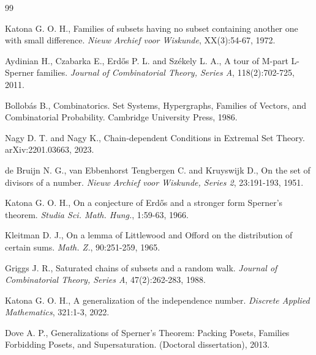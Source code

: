 \documentclass[11pt, reqno]{amsart}
\numberwithin{equation}{section}
\begin{document}
\begin{thebibliography}{99}

 Katona G. O. H., Families of subsets having no subset containing another one with small difference. \textit{Nieuw Archief voor Wiskunde}, XX(3):54-67, 1972.

 Aydinian H., Czabarka E., Erdős P. L. and Székely L. A., A tour of M-part L-Sperner families. \textit{Journal of Combinatorial Theory, Series A}, 118(2):702-725, 2011.

 Bollobás B., Combinatorics. Set Systems, Hypergraphs, Families of Vectors, and Combinatorial Probability. Cambridge University Press, 1986.

 Nagy D. T. and Nagy K., Chain-dependent Conditions in Extremal Set Theory. arXiv:2201.03663, 2023.

 de Bruijn N. G., van Ebbenhorst Tengbergen C. and Kruyswijk D., On the set of divisors of a number. \textit{Nieuw Archief voor Wiskunde, Series 2}, 23:191-193, 1951.

 Katona G. O. H., On a conjecture of Erdős and a stronger form Sperner’s theorem. \textit{Studia Sci. Math. Hung.}, 1:59-63, 1966.

 Kleitman D. J., On a lemma of Littlewood and Offord on the distribution of certain sums. \textit{Math. Z.}, 90:251-259, 1965.

 Griggs J. R., Saturated chains of subsets and a random walk. \textit{Journal of Combinatorial Theory, Series A}, 47(2):262-283, 1988.

 Katona G. O. H., A generalization of the independence number. \textit{Discrete Applied Mathematics}, 321:1-3, 2022.

 Dove A. P., Generalizations of Sperner's Theorem: Packing Posets, Families Forbidding Posets, and Supersaturation. (Doctoral dissertation), 2013.

\end{thebibliography}
\end{document}
